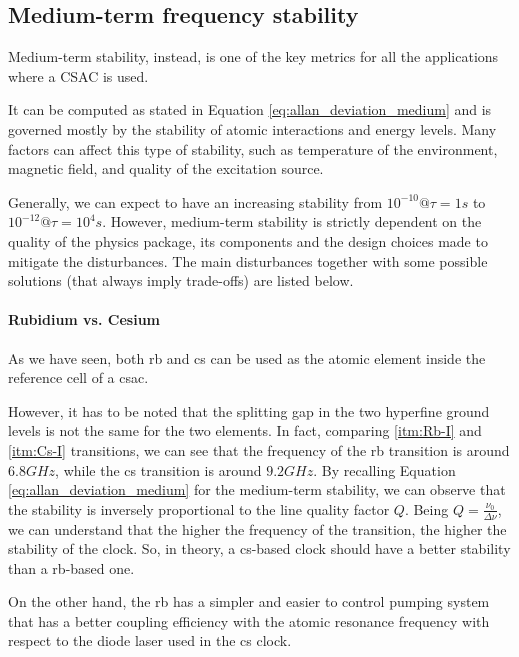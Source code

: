 \subsection{Medium-term frequency stability}
\label{subsec:medium_term_stability}

Medium-term stability, instead, is one of the key metrics for all the applications where a CSAC is used.

It can be computed as stated in Equation \ref{eq:allan_deviation_medium} and is governed mostly by the stability of atomic interactions and energy levels.
Many factors can affect this type of stability, such as temperature of the environment, magnetic field, and quality of the excitation source.

Generally, we can expect to have an increasing stability from $10^{-10} @ \tau=1s$ to $10^{-12} @ \tau=10^4s$.
However, medium-term stability is strictly dependent on the quality of the physics package, its components and the design choices made to mitigate the disturbances.
The main disturbances together with some possible solutions (that always imply trade-offs) are listed below.


\paragraph{Rubidium vs. Cesium}

As we have seen, both \acrshort{rb} and \acrshort{cs} can be used as the atomic element inside the reference cell of a \acrshort{csac}.

However, it has to be noted that the splitting gap in the two hyperfine ground levels is not the same for the two elements.
In fact, comparing \ref{itm:Rb-I} and \ref{itm:Cs-I} transitions, we can see that the frequency of the \acrshort{rb} transition is around $6.8GHz$, while the \acrshort{cs} transition is around $9.2GHz$.
By recalling Equation \ref{eq:allan_deviation_medium} for the medium-term stability, we can observe that the stability is inversely proportional to the line quality factor $Q$.
Being $Q = \frac{\nu_0}{\Delta\nu}$, we can understand that the higher the frequency of the transition, the higher the stability of the clock.
So, in theory, a \acrshort{cs}-based clock should have a better stability than a \acrshort{rb}-based one.

On the other hand, the \acrshort{rb} has a simpler and easier to control pumping system that has a better coupling efficiency with the atomic resonance frequency with respect to the diode laser used in the \acrshort{cs} clock.

